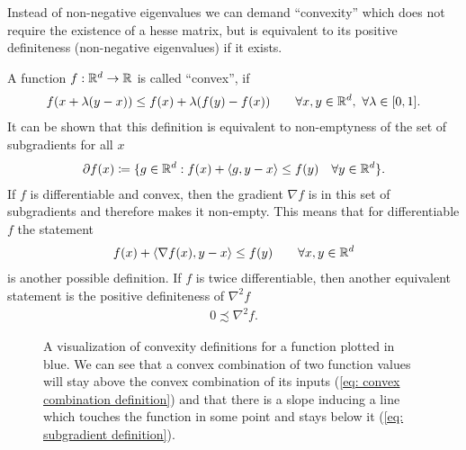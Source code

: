 Instead of non-negative eigenvalues we can demand ``convexity'' which does
not require the existence of a hesse matrix, but is equivalent to its positive
definiteness (non-negative eigenvalues) if it exists.
%
\begin{definition}[Convexity]\label{def: convexity}
	A function \(f:\mathbb{R}^d\to \mathbb{R}\) is called ``convex'', if 
	\begin{align}\label{eq: convex combination definition}
		f(x + \hesseEV(y-x)) \le f(x) + \hesseEV (f(y)-f(x))
		\qquad \forall x,y\in\reals^\dimension,\ \forall\hesseEV\in[0,1].
	\end{align}
	It can be shown \parencite[e.g.][Prop.
	1.1]{bubeckConvexOptimizationAlgorithms2015} that this definition is
	equivalent to non-emptyness of the set of subgradients for all \(x\)
	\begin{align}\label{eq: subgradient definition}
		\partial f(x) \coloneqq \{
			g \in\mathbb{R}^d: f(x) + \langle g, y-x\rangle \le f(y)
			\quad \forall y\in\mathbb{R}^d
		\}.
	\end{align}
	If \(f\) is differentiable and convex, then the gradient \(\nabla f\) is in
	this set of subgradients \parencite[e.g.][Prop.
	1.1]{bubeckConvexOptimizationAlgorithms2015} and therefore makes it non-empty.
	This means that for differentiable \(f\) the statement
	\begin{align*}
		f(x) + \langle\nabla f(x), y-x\rangle \le f(y)\qquad \forall x,y\in\mathbb{R}^d
	\end{align*}
	is another possible definition. If \(f\) is twice differentiable, then another
	equivalent statement \parencite[e.g.][Theorem
	2.1.4]{nesterovLecturesConvexOptimization2018} is the positive definiteness
	of \(\nabla^2 f\)
	\begin{align*}
		0\precsim\nabla^2 f.
	\end{align*}
\end{definition}
%
\begin{figure}[h]
	\centering
	\def\svgwidth{1\textwidth}
	
	\caption{
		A visualization of convexity definitions for a function plotted in blue.
		We can see that a convex combination of two function values will stay
		above the convex combination of its inputs
		(\ref{eq: convex combination definition}) and that there is a slope inducing
		a line which touches the function in some point and stays below it
		(\ref{eq: subgradient definition}).
	}
	\label{fig: visualize convexity definition}
\end{figure}
%
